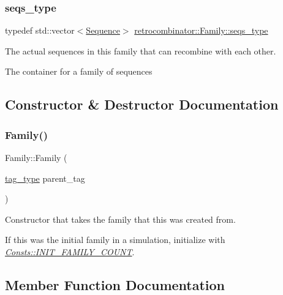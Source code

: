 \subsubsection{\texorpdfstring{seqs\+\_\+type}{seqs\_type}}
{\footnotesize\ttfamily typedef std\+::vector$<$\hyperlink{classretrocombinator_1_1Sequence}{Sequence}$>$ \hyperlink{classretrocombinator_1_1Family_a994b8646d1c0c4e19420d2e5c6c53c85}{retrocombinator\+::\+Family\+::seqs\+\_\+type}}



The actual sequences in this family that can recombine with each other. 

The container for a family of sequences 

\subsection{Constructor \& Destructor Documentation}
\mbox{\label{classretrocombinator_1_1Family_aefb8619ac695a3ad8e654ed8302668ee}} 
\subsubsection{\texorpdfstring{Family()}{Family()}}
{\footnotesize\ttfamily Family\+::\+Family (\begin{DoxyParamCaption}\item[{\hyperlink{namespaceretrocombinator_afd7c6eb4293e8c4d12827609a9a34b9b}{tag\+\_\+type}}]{parent\+\_\+tag }\end{DoxyParamCaption})}



Constructor that takes the family that this was created from. 

If this was the initial family in a simulation, initialize with {\itshape \hyperlink{namespaceretrocombinator_1_1Consts_af4adf5f1b75ede326285e110e2acf837}{Consts\+::\+I\+N\+I\+T\+\_\+\+F\+A\+M\+I\+L\+Y\+\_\+\+C\+O\+U\+NT}}. 

\subsection{Member Function Documentation}
\mbox{\label{classretrocombinator_1_1Family_a79b180c88225ee52d21da020375d2dfd}} 
